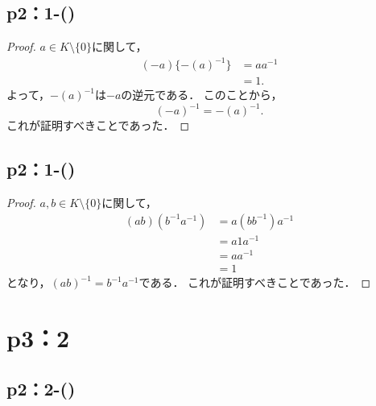 \documentclass[a4paper,10pt,fleqn]{ltjsarticle}
\begin{document}
\subsection*{p2：1-()}

\begin{leftbar}
    \begin{proof}
        $ a \in K \setminus \{ 0 \} $に関して，
        \begin{align*}
            (-a) \{ -(a)^{-1} \} & = aa^{-1} \\
                                 & =1.
        \end{align*}
        よって，$-(a)^{-1}$は$-a$の逆元である．
        このことから，
        \[
            (-a)^{-1} = -(a)^{-1}.
        \]
        これが証明すべきことであった．
    \end{proof}
\end{leftbar}
\subsection*{p2：1-()}
\begin{leftbar}
    \begin{proof}
        $ a ,b\in K \setminus \{ 0 \} $に関して，
        \begin{align*}
            (ab) (b^{-1} a^{-1}) & = a (bb^{-1}) a^{-1} \\
                                 & = a1a^{-1}           \\
                                 & = aa^{-1}            \\
                                 & = 1
        \end{align*}
        となり，$(ab)^{-1} = b^{-1} a^{-1}$である．
        これが証明すべきことであった．
    \end{proof}
\end{leftbar}
%
\newpage
\section*{p3：2}

\subsection*{p2：2-()}
\end{document}
